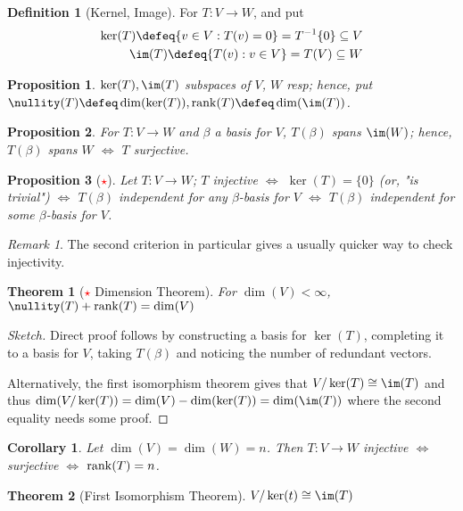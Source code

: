 \documentclass[12pt, oneside]{article}
\theoremstyle{definition}
\newtheorem{defn}{Definition}
\theoremstyle{plain}
\newtheorem{thm}{Theorem}
\newtheorem{cor}{Corollary}
\newtheorem{prop}{Proposition}
\theoremstyle{remark}
\newtheorem{remark}{Remark}
\begin{document}
\begin{defn}[Kernel, Image]
  For $T : V \to W$, and put \begin{align*}
  \ker(T) \defeq \{v \in V : T(v) = 0\} = T^{-1}\{0\}  \subseteq V\\
  \im(T)  \defeq \{T(v) : v \in V\} = T(V) \subseteq W
  \end{align*}
\end{defn}
\begin{prop}
  $\ker (T), \im(T)$ subspaces of $V$, $W$ resp; hence, put $\nullity(T) \defeq \dim(\ker(T)), \rank(T) \defeq \dim(\im(T))$.
\end{prop}

\begin{prop}
  For $T : V \to W$ and $\beta$ a basis for $V$, $T(\beta)$ spans $\im(W)$; hence, $T(\beta)$ spans $W$ $\iff$ $T$ surjective.
\end{prop}
\begin{prop}[\textcolor{red}{$\star$}]
  Let $T : V \to W$; $T$ injective $\iff$ $\ker(T) = \{0\}$ (or, "is trivial") $\iff$ $T(\beta)$ independent for any $\beta$-basis for $V$ $\iff$ $T(\beta)$ independent for some $\beta$-basis for $V$.
\end{prop}
\begin{remark}
  The second criterion in particular gives a usually quicker way to check injectivity.
\end{remark}

\begin{thm}[\textcolor{red}{$\star$} Dimension Theorem]
  For $\dim(V) < \infty$, $\nullity (T) + \rank(T) = \dim(V)$
\end{thm}
\begin{proof}[Sketch]
  Direct proof follows by constructing a basis for $\ker(T)$, completing it to a basis for $V$, taking $T(\beta)$ and noticing the number of redundant vectors.

  Alternatively, the first isomorphism theorem gives that $V/\ker(T) \cong \im(T)$ and thus $\dim(V/\ker(T)) = \dim(V) - \dim(\ker(T)) = \dim(\im(T))$ where the second equality needs some proof.
\end{proof}

\begin{cor}
Let $\dim(V) = \dim(W) = n$. Then $T : V \to W$ injective $\iff$ surjective $\iff$ $\rank(T) = n$.
\end{cor}

\begin{thm}[First Isomorphism Theorem]
  $V/\ker(t) \cong \im(T)$
\end{thm}
\end{document}
